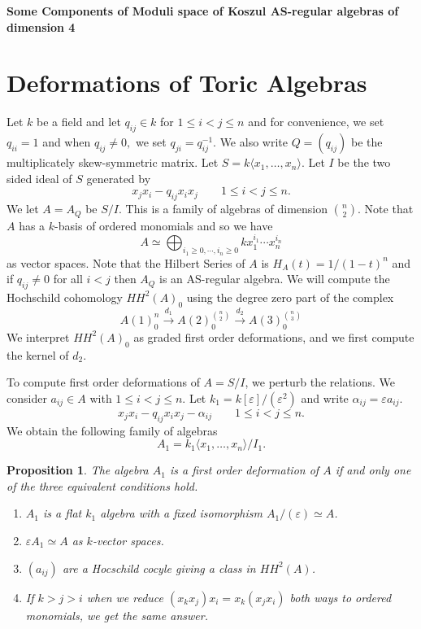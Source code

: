 \documentclass[12]{article}
\newtheorem{proposition}{Proposition}
\begin{document}
\begin{titlepage}

\centering
	
	{\huge\bfseries Some Components of  Moduli space of Koszul AS-regular algebras of dimension 4}

\end{titlepage}



\section{Deformations of Toric Algebras}
Let $k$ be a field and let $q_{ij} \in k$ for $1 \leq i < j \leq n$ and
for convenience, we set $q_{ii}=1$ and when $q_{ij} \neq 0,$ we set $q_{ji}=q_{ij}^{-1}$.  We also write $Q  =(q_{ij})$
be the multiplicately skew-symmetric matrix.
Let $S=k\langle x_1,\ldots,x_n\rangle$.
Let $I$ be the two sided ideal of $S$ generated by
$$x_jx_i - q_{ij} x_ix_j\quad \quad 1 \leq i < j \leq n.$$
We let $A = A_Q$ be $S/I$.  This is a family of algebras of dimension $\binom{n}{2}.$
Note that $A$ has a $k$-basis of ordered monomials and so we have
$$ A \simeq \bigoplus_{i_1\geq 0,\cdots, i_n \geq 0} k x_1^{i_1}\cdots x^{i_n}_n$$
as vector spaces.  Note that the Hilbert Series of $A$ is $H_A(t) = 1/(1-t)^n$ and if $q_{ij} \neq 0$ for all $i<j$ then $A_Q$ is an AS-regular algebra.
We will compute the Hochschild cohomology
$HH^2(A)_0$ using the degree zero part of the complex
$$ A(1)^n_0 \stackrel{d_1}{\to} A(2)^{\binom{n}{2}}_0 \stackrel{d_2}{\to}
  A(3)^{\binom{n}{3}}_0 $$
  We interpret $HH^2(A)_0$ as graded first order deformations, and we first compute the kernel of $d_2$.

To compute  first order deformations of $A = S/I$, we perturb the relations.
We consider $a_{ij} \in A$ with $1 \leq i < j \leq n$.
Let $k_1 = k[\varepsilon]/(\varepsilon^2)$ and write $\alpha_{ij} = \varepsilon a_{ij}$.
$$x_jx_i - q_{ij} x_ix_j  - \alpha_{ij} \quad \quad 1 \leq i < j \leq n.$$
We obtain the following family of algebras
$$A_1 = k_1\langle x_1,\ldots,x_n \rangle/I_1.$$

\begin{proposition}
  The algebra $A_1$ is a {\it first order deformation} of $A$ if and only one of the three equivalent conditions hold.
  \begin{enumerate}
    \item $A_1$ is a flat $k_1$ algebra with a fixed isomorphism $A_1/(\varepsilon) \simeq A$.
    \item $\varepsilon A_1 \simeq A$ as $k$-vector spaces.
    \item $(a_{ij})$ are a Hocschild cocyle giving a class in $HH^2(A)$.
    \item If $k>j>i$ when we reduce $(x_kx_j)x_i = x_k(x_jx_i)$ both ways to ordered monomials, we get the same answer.
  \end{enumerate}
\end{proposition}
\end{document}
